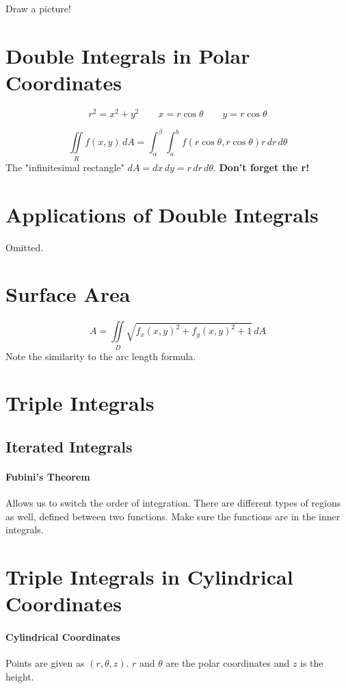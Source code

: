 \documentclass{report}  %
\begin{document}
Draw a picture!

\section{Double Integrals in Polar Coordinates}
\begin{equation}
	r^2 = x^2 + y^2 \qquad x = r \cos{\theta} \qquad y = r \cos{\theta}
\end{equation}

\begin{equation}
	\iint \limits_R f(x,y) \, dA = 
	\int_\alpha^\beta \int_a^b f(r \cos{\theta}, r \cos{\theta}) r \, dr \, d\theta
\end{equation}
The "infinitesimal rectangle" $dA = dx \, dy = r \, dr \, d\theta$. 
\textbf{Don't forget the r!}

\section{Applications of Double Integrals}
Omitted. 

\section{Surface Area}
\begin{equation}
	A = \iint \limits_D \sqrt{f_x(x,y)^2 + f_y(x,y)^2 + 1} \, dA 
\end{equation}
Note the similarity to the arc length formula.

\section{Triple Integrals}
\subsection*{Iterated Integrals}
\paragraph{Fubini's Theorem} Allows us to switch the order of integration. 
There are different types of regions as well, defined between two functions. 
Make sure the functions are in the inner integrals.

\section{Triple Integrals in Cylindrical Coordinates}
\paragraph{Cylindrical Coordinates} Points are given as $(r, \theta, z)$. 
$r$ and $\theta$ are the polar coordinates and $z$ is the height. 
\end{document}
